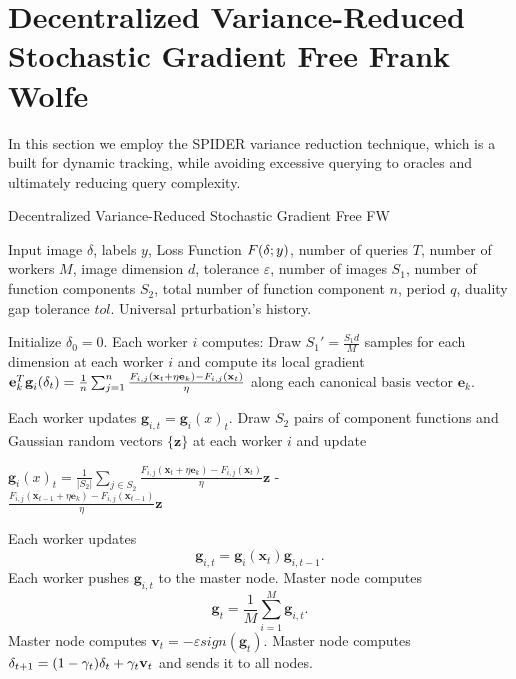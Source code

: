 \section{Decentralized Variance-Reduced Stochastic Gradient Free Frank Wolfe}
In this section we employ the SPIDER variance reduction technique, which is a built for dynamic tracking, while avoiding excessive querying to oracles and ultimately reducing query complexity.
\begin{algorithm}
	\caption{Decentralized Variance-Reduced Stochastic Gradient Free FW}\label{variance-reduced}
	\begin{algorithmic}[1]
		\Require Input image \boldmath$\delta$, labels $y$, Loss Function $F(\text{\boldmath}\delta;y)$, number of queries $T$, number of workers $M$, image dimension $d$, tolerance $\varepsilon$, number of images $S_1$, number of function components $S_2$, total number of function component $n$, period $q$, duality gap tolerance $tol$.
		\Ensure Universal prturbation's history.
		
		\State Initialize \boldmath$\delta_0 = \text{0}$.
		\State Each worker $i$ computes:
		\State Draw {\small$S_1' = \frac{S_1d}{M}$} samples for each dimension at each worker $i$ and compute its local gradient \newline
		{\small$ \textbf{e}_k^T\textbf{g}_i(\text{\boldmath} \delta_t) = \frac{1}{n}\sum_{j=1}^{n}\frac{F_{i,j}(\textbf{x}_t + \eta\textbf{e}_k) - F_{i,j}(\textbf{x}_t) }{\eta} $} along each canonical basis vector $\textbf{e}_k$.
		
		\State Each worker updates $\textbf{g}_{i,t} = \textbf{g}_i(x)_t$.
		\Else
		\State Draw $S_2$ pairs of component functions and Gaussian random vectors $\{\textbf{z}\}$ at each worker $i$ and update
		
		\parbox[b]{\linewidth}{$\textbf{g}_i(x)_t = \frac{1}{|S_2|} \sum_{j \in S_2}\frac{F_{i,j}(\textbf{x}_t + \eta\textbf{e}_k)- F_{i,j}(\textbf{x}_t) }{\eta} \textbf{z}$ -\\
			
			$\frac{F_{i,j}(\textbf{x}_{t-1} + \eta\textbf{e}_k) - F_{i,j}(\textbf{x}_{t-1}) }{\eta} \textbf{z}$}
				
		\State Each worker updates 
		\[\textbf{g}_{i,t} = \textbf{g}_i(\textbf{x}_t) \textbf{g}_{i,t-1}.\]
		\EndIf
		\State Each worker pushes $\textbf{g}_{i,t}$ to the master node.
		\State Master node computes 
		\[\textbf{g}_t = \frac{1}{M} \sum_{i=1}^{M} \textbf{g}_{i,t}.\]
		\State Master node computes $\textbf{v}_t = - \varepsilon sign(\textbf{g}_t)$.
		\State Master node computes \boldmath$\delta_{t+1} = (1-\gamma_t)\text{\boldmath}\delta_t + \gamma_t\textbf{v}_t$ and sends it to all nodes.
		\EndFor
	\end{algorithmic}
\end{algorithm}
